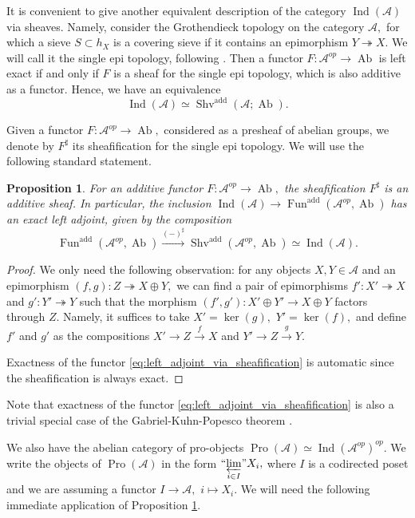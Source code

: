 \documentclass[11pt,leqno]{amsart}
\newtheorem{prop}[theo]{Proposition}
\numberwithin{equation}{section}
\newcommand{\prolim}[1][]{\mathop{\varprojlim}\limits_{#1}}
\newcommand{\proolim}[1][]{{``{\prolim[#1]}"}}
\newcommand{\xto}{\xrightarrow}
\newcommand{\onto}{\twoheadrightarrow}
\newcommand{\cA}{{\mathcal A}}
\newcommand{\Fun}{\operatorname{Fun}}
\newcommand{\Ab}{\operatorname{Ab}}
\newcommand{\Shv}{\operatorname{Shv}}
\newcommand{\add}{\operatorname{add}}
\newcommand{\Ind}{\operatorname{Ind}}
\newcommand{\Pro}{\operatorname{Pro}}
\begin{document}
It is convenient to give another equivalent description of the category $\Ind(\cA)$ via sheaves. Namely, consider the Grothendieck topology on the category $\cA,$ for which a sieve $S\subset h_X$ is a covering sieve if it contains an epimorphism $Y\onto X.$ We will call it the single epi topology, following \cite{Ka22}. Then a functor $F:\cA^{op}\to \Ab$ is left exact if and only if $F$ is a sheaf for the single epi topology, which is also additive as a functor. Hence, we have an equivalence
\begin{equation*}
\Ind(\cA)\simeq \Shv^{\add}(\cA;\Ab).
\end{equation*}

Given a functor $F:\cA^{op}\to\Ab,$ considered as a presheaf of abelian groups, we denote by $F^{\sharp}$ its sheafification for the single epi topology.  We will use the following standard statement.

\begin{prop}\label{prop:sheafification_of_additive_presheaves}
For an additive functor $F:\cA^{op}\to \Ab,$ the sheafification $F^{\sharp}$ is an additive sheaf. In particular, the inclusion $\Ind(\cA)\to \Fun^{\add}(\cA^{op},\Ab)$ has an exact left adjoint, given by the composition
\begin{equation}\label{eq:left_adjoint_via_sheafification}
\Fun^{\add}(\cA^{op},\Ab)\xto{(-)^{\sharp}} \Shv^{\add}(\cA^{op},\Ab)\simeq \Ind(\cA).
\end{equation} 
\end{prop}

\begin{proof}
We only need the following observation: for any objects $X,Y\in\cA$ and an epimorphism $(f,g):Z\onto X\oplus Y,$ we can find a pair of epimorphisms $f':X'\onto X$ and $g':Y'\onto Y$ such that the morphism $(f',g'):X'\oplus Y'\to X\oplus Y$ factors through $Z.$ Namely, it suffices to take $X'=\ker(g),$ $Y'=\ker(f),$ and define $f'$ and $g'$ as the compositions $X'\to Z\xto{f}X$ and $Y'\to Z\xto{g}Y.$

Exactness of the functor \eqref{eq:left_adjoint_via_sheafification} is automatic since the sheafification is always exact.
\end{proof}

Note that exactness of the functor \eqref{eq:left_adjoint_via_sheafification} is also a trivial special case of the Gabriel-Kuhn-Popesco theorem \cite{GP64, Ku94}.

We also have the abelian category of pro-objects $\Pro(\cA)\simeq \Ind(\cA^{op})^{op}.$ We write the objects of $\Pro(\cA)$ in the form $\proolim[i\in I]X_i,$ where $I$ is a codirected poset and we are assuming a functor $I\to\cA,$ $i\mapsto X_i.$ We will need the following immediate application of Proposition \ref{prop:sheafification_of_additive_presheaves}.
\end{document}
